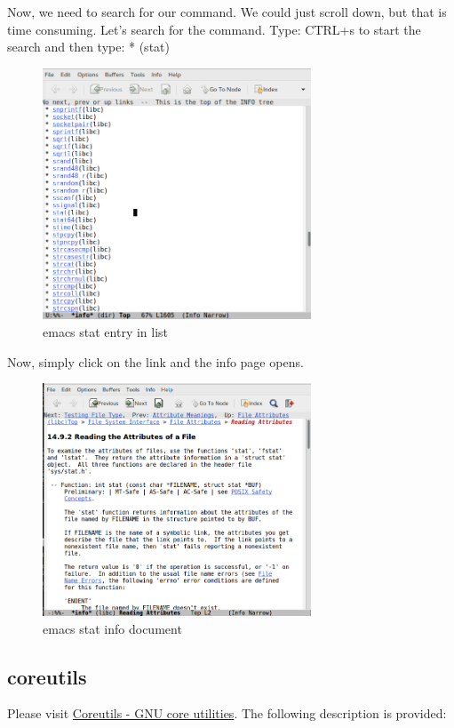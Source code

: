 Now, we need to search for our command. We could just scroll down, but that is time consuming. Let's search for the  command. Type: CTRL+s to start the search and then type: * (stat)

\begin{figure}[H]
\centering
\includegraphics[width=8cm]{figures/emacs_statlist}
\caption{emacs stat entry in list}
\label{emacsStatList}
\end{figure}

Now, simply click on the  link and the info page opens.

\begin{figure}[H]
\centering
\includegraphics[width=8cm]{figures/emacs_statinfo}
\caption{emacs stat info document}
\label{emacsStatInfo}
\end{figure}

\subsection{coreutils}

Please visit \href{http://www.gnu.org/software/coreutils/coreutils.html}{Coreutils - GNU core utilities}. The following description is provided:


